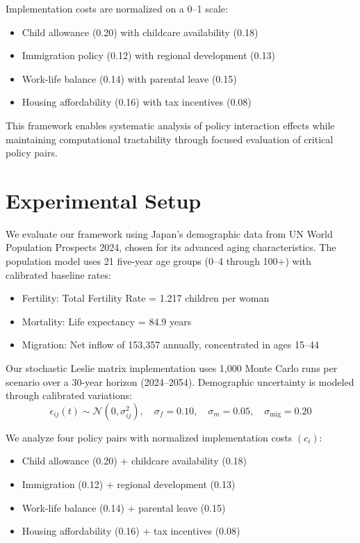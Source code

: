 \documentclass{article} %
\begin{document}
Implementation costs are normalized on a 0--1 scale:
\begin{itemize}
    \item Child allowance (0.20) with childcare availability (0.18)
    \item Immigration policy (0.12) with regional development (0.13)
    \item Work-life balance (0.14) with parental leave (0.15)
    \item Housing affordability (0.16) with tax incentives (0.08)
\end{itemize}

This framework enables systematic analysis of policy interaction effects while maintaining computational tractability through focused evaluation of critical policy pairs.

\section{Experimental Setup}
\label{sec:experimental}

We evaluate our framework using Japan's demographic data from UN World Population Prospects 2024, chosen for its advanced aging characteristics. The population model uses 21 five-year age groups (0--4 through 100+) with calibrated baseline rates:
\begin{itemize}
    \item Fertility: Total Fertility Rate = 1.217 children per woman
    \item Mortality: Life expectancy = 84.9 years
    \item Migration: Net inflow of 153,357 annually, concentrated in ages 15--44
\end{itemize}

Our stochastic Leslie matrix implementation uses 1,000 Monte Carlo runs per scenario over a 30-year horizon (2024--2054). Demographic uncertainty is modeled through calibrated variations:
\begin{equation}
    \epsilon_{ij}(t) \sim \mathcal{N}(0, \sigma_{ij}^2), \quad \sigma_f = 0.10, \quad \sigma_m = 0.05, \quad \sigma_{\text{mig}} = 0.20
\end{equation}

We analyze four policy pairs with normalized implementation costs $(c_i)$:
\begin{itemize}
    \item Child allowance (0.20) + childcare availability (0.18)
    \item Immigration (0.12) + regional development (0.13)
    \item Work-life balance (0.14) + parental leave (0.15)
    \item Housing affordability (0.16) + tax incentives (0.08)
\end{itemize}
\end{document}

